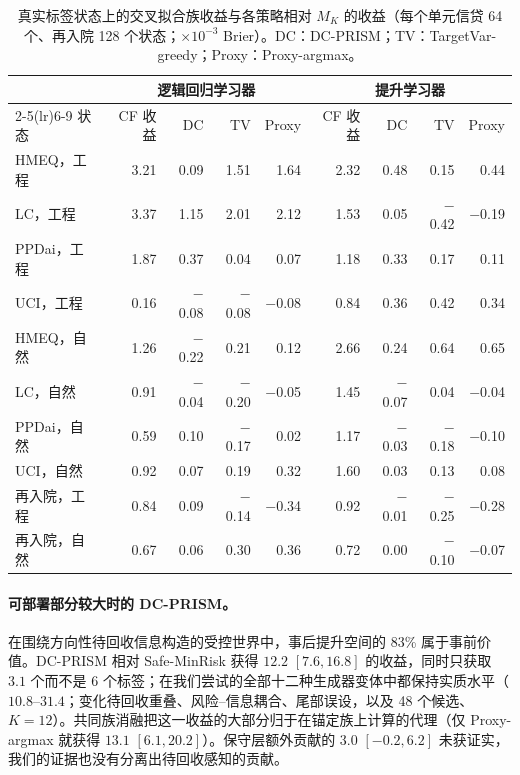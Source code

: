 \documentclass[runningheads]{llncs}
\begin{document}
\begin{table}[t]
\caption{真实标签状态上的交叉拟合族收益与各策略相对 $M_K$ 的收益（每个单元信贷 64 个、再入院 128 个状态；$\times10^{-3}$ Brier）。DC：DC-PRISM；TV：TargetVar-greedy；Proxy：Proxy-argmax。}
\label{tab:who}
\centering\scriptsize
\setlength{\tabcolsep}{3pt}
\begin{tabular}{lrrrrrrrr}
\toprule
& \multicolumn{4}{c}{逻辑回归学习器} & \multicolumn{4}{c}{提升学习器} \\
\cmidrule(lr){2-5}\cmidrule(lr){6-9}
状态 & CF 收益 & DC & TV & Proxy & CF 收益 & DC & TV & Proxy \\
\midrule
HMEQ，工程 & 3.21 & 0.09 & 1.51 & 1.64 & 2.32 & 0.48 & 0.15 & 0.44 \\
LC，工程 & 3.37 & 1.15 & 2.01 & 2.12 & 1.53 & 0.05 & $-$0.42 & $-$0.19 \\
PPDai，工程 & 1.87 & 0.37 & 0.04 & 0.07 & 1.18 & 0.33 & 0.17 & 0.11 \\
UCI，工程 & 0.16 & $-$0.08 & $-$0.08 & $-$0.08 & 0.84 & 0.36 & 0.42 & 0.34 \\
HMEQ，自然 & 1.26 & $-$0.22 & 0.21 & 0.12 & 2.66 & 0.24 & 0.64 & 0.65 \\
LC，自然 & 0.91 & $-$0.04 & $-$0.20 & $-$0.05 & 1.45 & $-$0.07 & 0.04 & $-$0.04 \\
PPDai，自然 & 0.59 & 0.10 & $-$0.17 & 0.02 & 1.17 & $-$0.03 & $-$0.18 & $-$0.10 \\
UCI，自然 & 0.92 & 0.07 & 0.19 & 0.32 & 1.60 & 0.03 & 0.13 & 0.08 \\
再入院，工程 & 0.84 & 0.09 & $-$0.14 & $-$0.34 & 0.92 & $-$0.01 & $-$0.25 & $-$0.28 \\
再入院，自然 & 0.67 & 0.06 & 0.30 & 0.36 & 0.72 & 0.00 & $-$0.10 & $-$0.07 \\
\bottomrule
\end{tabular}
\end{table}

\paragraph{可部署部分较大时的 DC-PRISM。}在围绕方向性待回收信息构造的受控世界中，事后提升空间的 83\% 属于事前价值。DC-PRISM 相对 Safe-MinRisk 获得 $12.2$ $[7.6,16.8]$ 的收益，同时只获取 $3.1$ 个而不是 6 个标签；在我们尝试的全部十二种生成器变体中都保持实质水平（$10.8$--$31.4$；变化待回收重叠、风险--信息耦合、尾部误设，以及 48 个候选、$K=12$）。共同族消融把这一收益的大部分归于在锚定族上计算的代理（仅 Proxy-argmax 就获得 $13.1$ $[6.1,20.2]$）。保守层额外贡献的 $3.0$ $[-0.2,6.2]$ 未获证实，我们的证据也没有分离出待回收感知的贡献。
\end{document}
